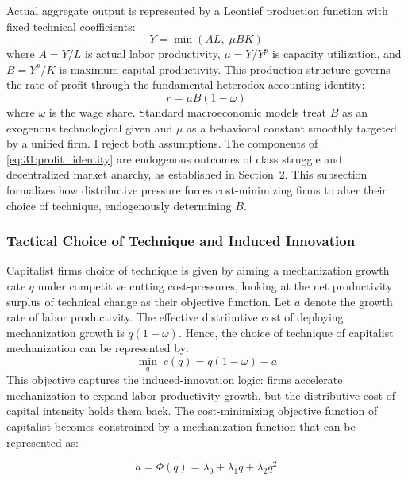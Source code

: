 Actual aggregate output is represented by a Leontief
production function with fixed technical coefficients:
\begin{equation}
	Y = \min\left( A L,\; \mu B K \right)
	\label{eq:31:leontief}
\end{equation}
where $A = Y/L$ is actual labor productivity, $\mu = Y/Y^p$
is capacity utilization, and $B = Y^p/K$ is maximum capital
productivity. This production structure governs the rate of
profit through the fundamental heterodox accounting identity:
\begin{equation}
	r = \mu B (1 - \omega)
	\label{eq:31:profit_identity}
\end{equation}
where $\omega$ is the wage share. Standard macroeconomic
models treat $B$ as an exogenous technological given and $\mu$
as a behavioral constant smoothly targeted by a unified firm.
I reject both assumptions. The components of
\eqref{eq:31:profit_identity} are endogenous outcomes of
class struggle and decentralized market anarchy, as
established in Section~2. This subsection formalizes how
distributive pressure forces cost-minimizing firms to alter
their choice of technique, endogenously determining $B$.

\subsubsection{Tactical Choice of Technique and Induced
	Innovation}

Capitalist firms choice of technique is given by aiming a mechanization growth rate $q$ under competitive cutting cost-pressures, looking at the net productivity surplus of technical change as their objective function.  Let $a$ denote the growth rate of
labor productivity. The effective distributive cost of
deploying mechanization growth is $q(1-\omega)$. Hence, the choice of technique of capitalist mechanization can be represented by: 
\begin{equation}
	\min_{q}\; c(q) = q(1-\omega) - a 
	\label{eq:31:objective}
\end{equation}
This objective captures the induced-innovation logic: firms
accelerate mechanization to expand labor productivity growth,
but the distributive cost of capital intensity holds them
back. The cost-minimizing objective function of capitalist becomes constrained by a mechanization function that can be represented as:

\begin{equation}
	a = \Phi(q) = \lambda_0 + \lambda_1 q + \lambda_2 q^2
	\label{eq:31:frontier}
\end{equation}

